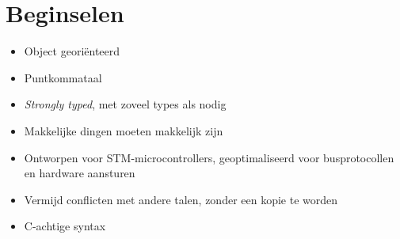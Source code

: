 \documentclass[main.tex]{subfiles}
\begin{document}
\section{Beginselen}

\begin{itemize}
    \item Object georiënteerd
    \item Puntkommataal
    \item \textit{Strongly typed}, met zoveel types als nodig
    \item Makkelijke dingen moeten makkelijk zijn
    \item Ontworpen voor STM-microcontrollers, geoptimaliseerd voor busprotocollen en hardware aansturen
    \item Vermijd conflicten met andere talen, zonder een kopie te worden
    \item C-achtige syntax
\end{itemize}
\end{document}

